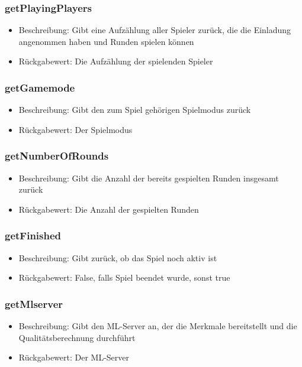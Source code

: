 \documentclass[a4paper]{scrreprt}
\begin{document}
	\subsubsection{getPlayingPlayers}
	\begin{itemize}
		\item Beschreibung: Gibt eine Aufzählung aller Spieler zurück, die die Einladung angenommen haben und Runden spielen können
		\item Rückgabewert: Die Aufzählung der spielenden Spieler
	\end{itemize}
	\subsubsection{getGamemode}
	\begin{itemize}
		\item Beschreibung: Gibt den zum Spiel gehörigen Spielmodus zurück
		\item Rückgabewert: Der Spielmodus
	\end{itemize}
	\subsubsection{getNumberOfRounds}
	\begin{itemize}
		\item Beschreibung: Gibt die Anzahl der bereits gespielten Runden insgesamt zurück
		\item Rückgabewert: Die Anzahl der gespielten Runden
	\end{itemize}     
	\subsubsection{getFinished}
	\begin{itemize}
		\item Beschreibung: Gibt zurück, ob das Spiel noch aktiv ist
		\item Rückgabewert: False, falls Spiel beendet wurde, sonst true
	\end{itemize}
	\subsubsection{getMlserver}
	\begin{itemize}
		\item Beschreibung: Gibt den ML-Server an, der die Merkmale bereitstellt und die Qualitätsberechnung durchführt
		\item Rückgabewert: Der ML-Server
	\end{itemize}
\end{document}
